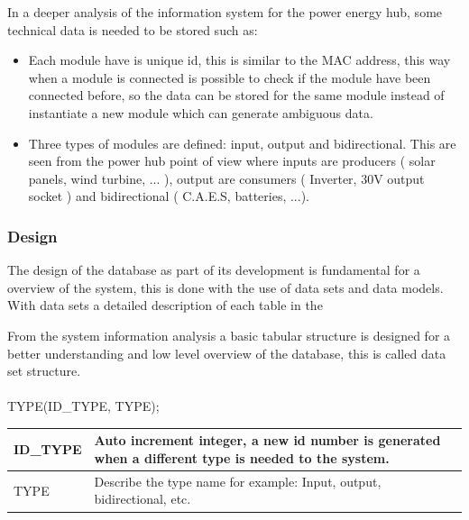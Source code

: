 In a deeper analysis of the information system for the power energy hub, some technical data is needed to be stored such as:
	\begin{itemize}
		\item Each module have is unique id, this is similar to the MAC address, this way when a module is connected is possible to check if the module have been connected before, so the data can be stored for the same module instead of instantiate a new module which can generate ambiguous data.
		\item Three types of modules are defined: input, output and bidirectional. This are seen from the power hub point of view where inputs are producers ( solar panels, wind turbine, ... ), output are consumers ( Inverter, 30V output socket ) and bidirectional ( C.A.E.S, batteries, ...).
	\end{itemize}

%	
%	
\subsubsection{Design}
The design of the database as part of its development is fundamental for a overview of the system, this is done with the use of data sets and data models. With data sets a detailed description of each table in the 

From the system information analysis a basic tabular structure is designed for a better understanding and low level overview of the database, this is called data set structure.
\\\\

TYPE(ID\_TYPE, TYPE);

\begin{table}[H]
\centering
	\begin{tabular}{| p{2cm} | p{10cm} |}
		\hline
		ID\_TYPE & Auto increment integer, a new id number is generated when a different type is needed to the system. \\\hline
		TYPE & Describe the type name for example: Input, output, bidirectional, etc.\\\hline
	\end{tabular}
\end{table}


